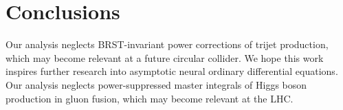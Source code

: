 \section{Conclusions}\label{sec:conclusions}

Our analysis neglects BRST-invariant power corrections of trijet
production, which may become relevant at a future circular collider. We
hope this work inspires further research into asymptotic neural ordinary
differential equations. Our analysis neglects power-suppressed master
integrals of Higgs boson production in gluon fusion, which may become
relevant at the LHC.

